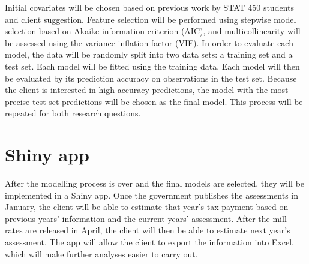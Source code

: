 \documentclass{article}
\begin{document}
\bigskip
Initial covariates will be chosen based on previous work by STAT 450 students and client suggestion.  Feature selection will be performed using stepwise model selection based on Akaike information criterion (AIC), and multicollinearity will be assessed using the variance inflation factor (VIF). In order to evaluate each model, the data will be randomly split into two data sets: a training set and a test set. Each model will be fitted using the training data. Each model will then be evaluated by its prediction accuracy on observations in the test set. Because the client is interested in high accuracy predictions, the model with the most precise test set predictions will be chosen as the final model. This process will be repeated for both research questions.




\section{Shiny app}

After the modelling process is over and the final models are selected, they will be implemented in a Shiny app. Once the government publishes the assessments in January, the client will be able to estimate that year's tax payment based on previous years' information and the current years' assessment. After the mill rates are released in April, the client will then be able to estimate next year's assessment. The app will allow the client to export the information into Excel, which will make further analyses easier to carry out.








\end{document}
